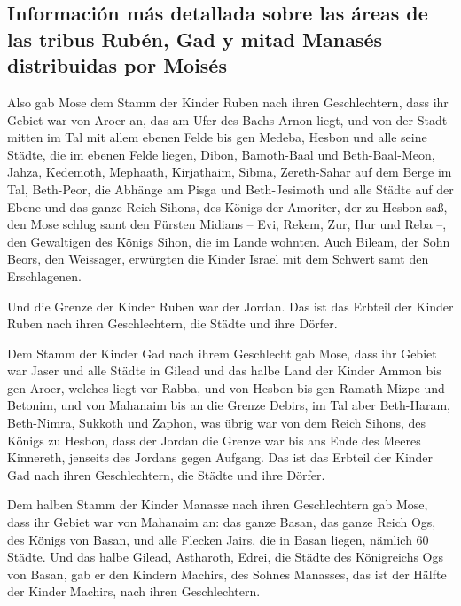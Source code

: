 \hypertarget{informaciuxf3n-muxe1s-detallada-sobre-las-uxe1reas-de-las-tribus-rubuxe9n-gad-y-mitad-manasuxe9s-distribuidas-por-moisuxe9s}{%
\subsection{Información más detallada sobre las áreas de las tribus
Rubén, Gad y mitad Manasés distribuidas por
Moisés}\label{informaciuxf3n-muxe1s-detallada-sobre-las-uxe1reas-de-las-tribus-rubuxe9n-gad-y-mitad-manasuxe9s-distribuidas-por-moisuxe9s}}

 Also gab Mose dem Stamm der Kinder Ruben nach ihren
Geschlechtern,  dass ihr Gebiet war von Aroer an, das am
Ufer des Bachs Arnon liegt, und von der Stadt mitten im Tal mit allem
ebenen Felde bis gen Medeba,  Hesbon und alle seine
Städte, die im ebenen Felde liegen, Dibon, Bamoth-Baal und
Beth-Baal-Meon,  Jahza, Kedemoth, Mephaath,
 Kirjathaim, Sibma, Zereth-Sahar auf dem Berge im Tal,
 Beth-Peor, die Abhänge am Pisga und Beth-Jesimoth
 und alle Städte auf der Ebene und das ganze Reich
Sihons, des Königs der Amoriter, der zu Hesbon saß, den Mose schlug samt
den Fürsten Midians -- Evi, Rekem, Zur, Hur und Reba --, den Gewaltigen
des Königs Sihon, die im Lande wohnten.  Auch Bileam, der
Sohn Beors, den Weissager, erwürgten die Kinder Israel mit dem Schwert
samt den Erschlagenen.

 Und die Grenze der Kinder Ruben war der Jordan. Das ist
das Erbteil der Kinder Ruben nach ihren Geschlechtern, die Städte und
ihre Dörfer.

 Dem Stamm der Kinder Gad nach ihrem Geschlecht gab Mose,
 dass ihr Gebiet war Jaser und alle Städte in Gilead und
das halbe Land der Kinder Ammon bis gen Aroer, welches liegt vor Rabba,
 und von Hesbon bis gen Ramath-Mizpe und Betonim, und von
Mahanaim bis an die Grenze Debirs,  im Tal aber
Beth-Haram, Beth-Nimra, Sukkoth und Zaphon, was übrig war von dem Reich
Sihons, des Königs zu Hesbon, dass der Jordan die Grenze war bis ans
Ende des Meeres Kinnereth, jenseits des Jordans gegen Aufgang.
 Das ist das Erbteil der Kinder Gad nach ihren
Geschlechtern, die Städte und ihre Dörfer.

 Dem halben Stamm der Kinder Manasse nach ihren
Geschlechtern gab Mose,  dass ihr Gebiet war von Mahanaim
an: das ganze Basan, das ganze Reich Ogs, des Königs von Basan, und alle
Flecken Jairs, die in Basan liegen, nämlich 60 Städte. 
Und das halbe Gilead, Astharoth, Edrei, die Städte des Königreichs Ogs
von Basan, gab er den Kindern Machirs, des Sohnes Manasses, das ist der
Hälfte der Kinder Machirs, nach ihren Geschlechtern.

